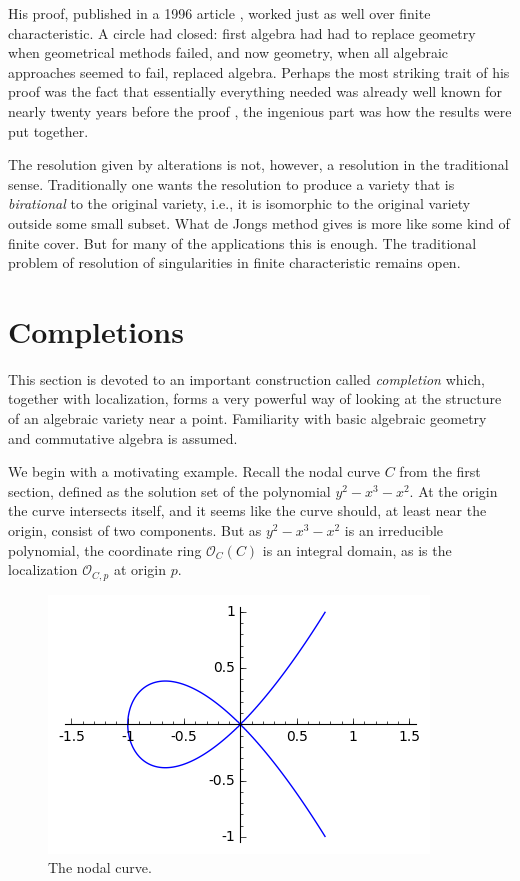 \documentclass[12pt,a4paper,leqno]{article}
\newcommand{\OO}{\mathcal{O}}
\theoremstyle{plain}
\theoremstyle{definition}
\theoremstyle{remark}
\begin{document}
His proof, published in a 1996 article \cite{Jong}, worked just as well over finite characteristic. A circle had closed: first algebra had had to replace geometry when geometrical methods failed, and now geometry, when all algebraic approaches seemed to fail, replaced algebra. Perhaps the most striking trait of his proof was the fact that essentially everything needed was already well known for nearly twenty years before the proof \cite{HLOQ}, the ingenious part was how the results were put together.

The resolution given by alterations is not, however, a resolution in the traditional sense. Traditionally one wants the resolution to produce a variety that is \emph{birational} to the original variety, i.e., it is isomorphic to the original variety outside some small subset. What de Jongs method gives is more like some kind of finite cover. But for many of the applications this is enough. The traditional problem of resolution of singularities in finite characteristic remains open.


\section{Completions}

This section is devoted to an important construction called \emph{completion} which, together with localization, forms a very powerful way of looking at the structure of an algebraic variety near a point. Familiarity with basic algebraic geometry and commutative algebra is assumed.

We begin with a motivating example. Recall the nodal curve $C$ from the first section, defined as the solution set of the polynomial $y^2 - x^3 - x^2$. At the origin the curve intersects itself, and it seems like the curve should, at least near the origin, consist of two components. But as $y^2 - x^3 - x^2$ is an irreducible polynomial, the coordinate ring $\OO_C (C)$ is an integral domain, as is the localization $\OO_{C,p}$ at origin $p$.

\begin{figure}[!htbp]\label{node2}
\begin{center}
\includegraphics{pics/node.png}
\caption{The nodal curve.}
\end{center}
\end{figure}
\end{document}
